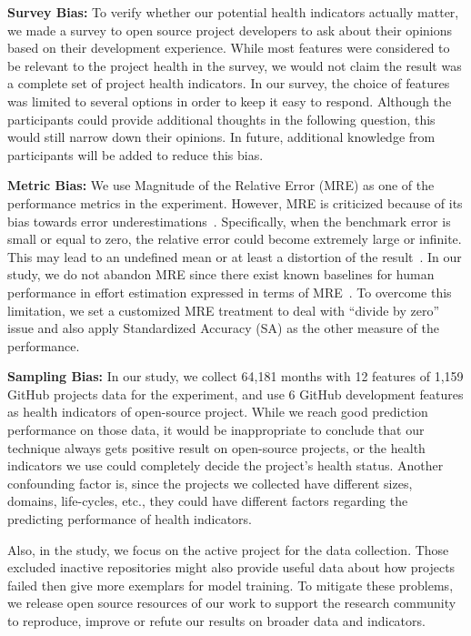 \documentclass[smallextended]{svjour3}
\newcommand{\respto}[1]{
\fcolorbox{black}{black!15}{%
\label{resp:#1}%
\bf\scriptsize R{#1}}}
\newcommand{\BLUE}{\color{blue}}
\newcommand{\BLACK}{\color{black}}
\begin{document}
\BLUE
\textbf{Survey Bias:} \respto{4B2} To verify whether our potential health indicators actually matter, we made a survey to open source project developers to ask about their opinions based on their development experience. While most features were considered to be relevant to the project health in the survey, we would not claim the result was a complete set of project health indicators. In our survey, the choice of features was limited to several options in order to keep it easy to respond. Although the participants could provide additional thoughts in the following question, this would still narrow down their opinions. In future, additional knowledge from participants will be added to reduce this bias. 
\BLACK

\textbf{Metric Bias:} We use Magnitude of the Relative Error (MRE) as one of the performance metrics in the experiment. However, MRE is criticized because of its bias towards error underestimations~\cite{foss2003simulation,kitchenham2001accuracy,korte2008confidence,port2008comparative,shepperd2000building,stensrud2003further}. Specifically, when the benchmark error is small or equal to zero, the relative error could become extremely large or infinite. This may lead to an undefined mean or at least a distortion of the result~\cite{chen2017new}. In our study, we do not abandon MRE since there exist known baselines for human performance in effort estimation expressed in terms of MRE~\cite{Jorgensen03}. To overcome this limitation, we set a customized MRE treatment to deal with ``divide by zero'' issue and also apply Standardized Accuracy (SA) as the other measure of the performance.

\textbf{Sampling Bias:} 
In our study, we collect 64,181 months with 12 features of 1,159 GitHub projects data for the experiment, and use 6 GitHub development features as health indicators of open-source project. While we reach good prediction performance on those data, it would be inappropriate to conclude that our technique always gets positive result on open-source projects, or the health indicators we use could completely decide the project's health status. 
Another confounding factor is, since the projects we collected have different sizes, domains, life-cycles, etc., they could have different factors regarding the predicting performance of health indicators.
\BLUE
\respto{4G2} 
Also, in the study, we focus on the active project for the data collection. Those excluded inactive repositories might also provide useful data about how projects failed then give more exemplars for model training.
\BLACK
To mitigate these problems, we release open source resources of our work to support the research community to reproduce, improve or refute our results on broader data and indicators.
\end{document}
